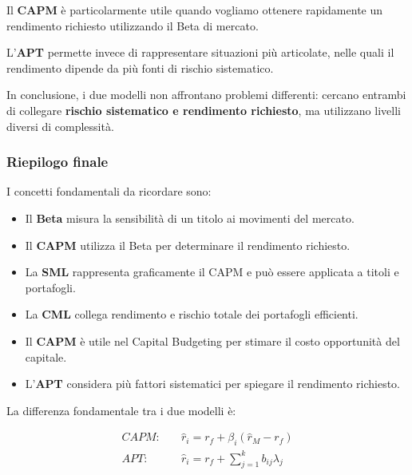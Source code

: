 \noindent Il \textbf{CAPM} è particolarmente utile
quando vogliamo ottenere rapidamente
un rendimento richiesto utilizzando
il Beta di mercato.

\medskip

\noindent L'\textbf{APT} permette invece
di rappresentare situazioni più articolate,
nelle quali il rendimento dipende
da più fonti di rischio sistematico.

\medskip

\noindent In conclusione, i due modelli
non affrontano problemi differenti:
cercano entrambi di collegare
\textbf{rischio sistematico e rendimento richiesto},
ma utilizzano livelli diversi di complessità.


\subsubsection*{Riepilogo finale}

\noindent I concetti fondamentali da ricordare sono:

\begin{itemize}
    \item Il \textbf{Beta} misura la sensibilità
    di un titolo ai movimenti del mercato.

    \item Il \textbf{CAPM} utilizza il Beta
    per determinare il rendimento richiesto.

    \item La \textbf{SML} rappresenta graficamente
    il CAPM e può essere applicata
    a titoli e portafogli.

    \item La \textbf{CML} collega rendimento
    e rischio totale dei portafogli efficienti.

    \item Il \textbf{CAPM} è utile nel Capital Budgeting
    per stimare il costo opportunità del capitale.

    \item L'\textbf{APT} considera più fattori
    sistematici per spiegare il rendimento richiesto.
\end{itemize}

\noindent La differenza fondamentale tra i due modelli è:

\[
\boxed{
\begin{aligned}
CAPM:\quad&
\hat{r}_i=r_f+\beta_i(\hat{r}_M-r_f)\\[6pt]
APT:\quad&
\hat{r}_i=r_f+\sum_{j=1}^{k}b_{ij}\lambda_j
\end{aligned}
}
\]

